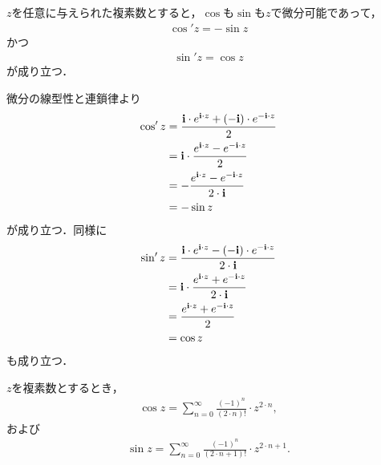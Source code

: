	\begin{screen}
		\begin{thm}
		\label{thm:derivatives_of_trigonometric_functions}
			$z$を任意に与えられた複素数とすると，$\cos$も$\sin$も$z$で微分可能であって，
			\begin{align}
				\cos'{z} = - \sin{z}
			\end{align}
			かつ
			\begin{align}
				\sin'{z} = \cos{z}
			\end{align}
			が成り立つ．
		\end{thm}
	\end{screen}
	
	\begin{sketch}
		微分の線型性と連鎖律より
		\begin{align}
			\cos'{z}
			&= \frac{\mathbf{i} \cdot e^{\mathbf{i} \cdot z} + (-\mathbf{i}) \cdot e^{-\mathbf{i} \cdot z}}{2} \\
			&= \mathbf{i} \cdot \frac{e^{\mathbf{i} \cdot z} - e^{-\mathbf{i} \cdot z}}{2} \\
			&= -\frac{e^{\mathbf{i} \cdot z} - e^{-\mathbf{i} \cdot z}}{2 \cdot \mathbf{i}} \\
			&= -\sin{z}
		\end{align}
		が成り立つ．同様に
		\begin{align}
			\sin'{z}
			&= \frac{\mathbf{i} \cdot e^{\mathbf{i} \cdot z} - (-\mathbf{i}) \cdot e^{-\mathbf{i} \cdot z}}{2 \cdot \mathbf{i}} \\
			&= \mathbf{i} \cdot \frac{e^{\mathbf{i} \cdot z} + e^{-\mathbf{i} \cdot z}}{2 \cdot \mathbf{i}} \\
			&= \frac{e^{\mathbf{i} \cdot z} + e^{-\mathbf{i} \cdot z}}{2} \\
			&= \cos{z}
		\end{align}
		も成り立つ．
		\QED
	\end{sketch}
	
	\begin{screen}
		\begin{thm}[余弦と正弦の級数表示]
			$z$を複素数とするとき，
			\begin{align}
				\cos{z} = \sum_{n=0}^\infty \frac{(-1)^{n}}{(2 \cdot n)!} \cdot z^{2 \cdot n},
			\end{align}
			および
			\begin{align}
				\sin{z} = \sum_{n=0}^\infty \frac{(-1)^{n}}{(2 \cdot n + 1)!} \cdot z^{2 \cdot n + 1}.
			\end{align}
		\end{thm}
	\end{screen}
	
